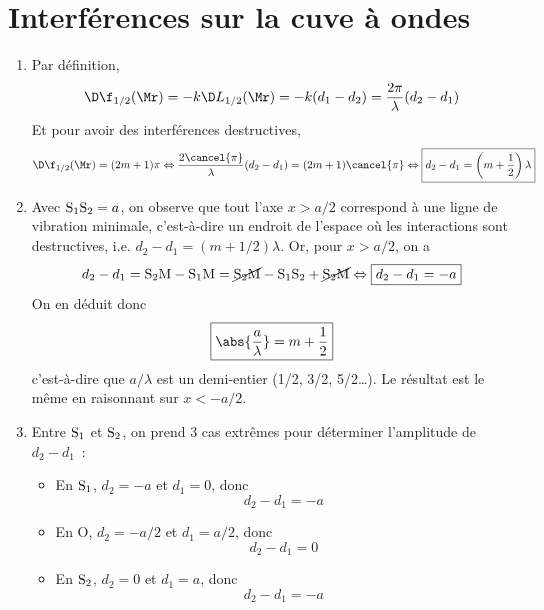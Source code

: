 \documentclass[a4paper, 12pt, final, garamond]{book}
\begin{document}
\section{Interférences sur la cuve à ondes}
\begin{enumerate}
    \item Par définition,
        \begin{gather*}
            \D\f_{1/2}(\Mr) = -k\D L_{1/2}(\Mr) = -k(d_1 - d_2) =
            \frac{2\pi}{\lambda}(d_2-d_1)
        \end{gather*}
        Et pour avoir des interférences destructives,
        \begin{gather*}
            \D\f_{1/2}(\Mr) = (2m+1)\pi
            \Leftrightarrow
            \frac{2\cancel{\pi}}{\lambda}(d_2-d_1) = (2m+1)\cancel{\pi}
            \Leftrightarrow
            \boxed{d_2-d_1 = \left(m+\frac{1}{2}\right)\lambda}
        \end{gather*}
    \item Avec ${\rm S_1S_2} = a$, on observe que tout l'axe $x > a/2$
        correspond à une ligne de vibration minimale, c'est-à-dire un endroit de
        l'espace où les interactions sont destructives, i.e. $d_2-d_1 =
        (m+1/2)\lambda$. Or, pour $x > a/2$, on a
        \begin{gather*}
            d_2 - d_1 = {\rm S_2M} - {\rm S_1M}
            = \cancel{\rm S_2M} - {\rm S_1S_2} + \cancel{\rm S_2M}
            \Leftrightarrow
            \boxed{d_2 - d_1 = -a}
        \end{gather*}
        On en déduit donc
        \begin{gather*}
            \boxed{\abs{\frac{a}{\lambda}} = m+\frac{1}{2}}
        \end{gather*}
        c'est-à-dire que $a/\lambda$ est un demi-entier (1/2, 3/2, 5/2…). Le
        résultat est le même en raisonnant sur $x < -a/2$.
    \item Entre $\rm S_1$ et $\rm S_2$, on prend 3 cas extrêmes pour déterminer
        l'amplitude de $d_2 - d_1$~:
        \begin{itemize}
            \item En $\rm S_1$, $d_2 = -a$ et $d_1 = 0$, donc
                \[d_2 - d_1 = -a\]
            \item En O, $d_2 = -a/2$ et $d_1 = a/2$, donc
                \[d_2 - d_1 = 0\]
            \item En $\rm S_2$, $d_2 = 0$ et $d_1 = a$, donc
                \[d_2 - d_1 = -a\]
        \end{itemize}

\end{enumerate}
\end{document}
